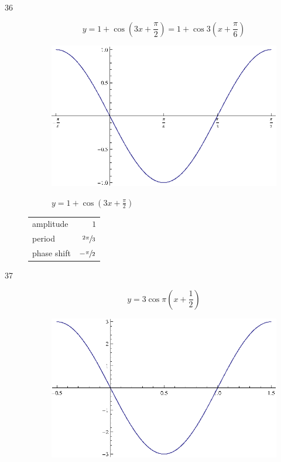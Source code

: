 \documentclass{exam}
\begin{document}
\begin{description}
      \item[36]
        \[
          y = 1 + \cos \left( 3x + \frac{\pi}{2} \right) = 1 + \cos 3 \left( x + \frac{\pi}{6} \right)
        \]

        \begin{figure}[H]
          \centering
          \includegraphics[scale=1.0]{exercise36.eps}

          $y = 1 + \cos \left( 3x + \frac{\pi}{2} \right)$
        \end{figure}

        \begin{tabular}[H]{lr}
          \toprule
          amplitude   & $1$ \\
          period      & $\sfrac{2 \pi}{3}$ \\
          phase shift & $- \sfrac{\pi}{2}$ \\
          \bottomrule
        \end{tabular}

      \pagebreak

      \item[37]
        \[
          y = 3 \cos \pi \left( x + \frac{1}{2} \right) 
        \]

        \begin{figure}[H]
          \centering
          \includegraphics[scale=1.0]{exercise37.eps}


\end{figure}
\end{description}
\end{document}
